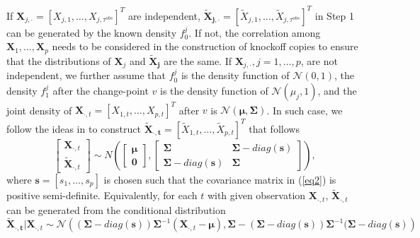 \documentclass[]{interact}
\theoremstyle{plain}%
\theoremstyle{definition}
\theoremstyle{remark}
\begin{document}
If $\bm X_{j,\cdot} = [X_{j,1}, \ldots, X_{j,\tau^{obs}}]^T$ are independent, $\bm{\tilde X_{j,\cdot}} = [\tilde X_{j,1}, \ldots, \tilde X_{j,\tau^{obs}}]^T$ in Step 1 can be generated by the known density $f_0^j$. If not, the correlation among $\bm X_1, \ldots, \bm X_p$ needs to be considered in the construction of knockoff copies to ensure that the distributions of $\bm X_j$ and $\bm{\tilde X_j}$ are the same. If $\bm X_{j,\cdot}, j=1,\ldots,p$, are not independent, we further assume that $f^j_0$ is the density function of $\mathcal{N} (0,1)$, the density $f_1^j$ after the change-point $v$ is the density function of $\mathcal{N} (\mu_j, 1)$, and the joint density of $\bm X_{\cdot, t} = [X_{1,t}, \ldots, X_{p,t}]^T$ after $v$ is $\mathcal{N} (\bm \mu, \bm \Sigma)$. In such case, we follow the ideas in \cite{barber2015controlling} to construct $\bm{\tilde X_{\cdot, t}} = [\tilde X_{1,t}, \ldots, \tilde X_{p,t}]^T$ that follows 
\begin{equation} \label{eq2}
\begin{bmatrix}
\bm X_{\cdot,t} \\
\bm{\tilde X }_{\cdot,t}
\end{bmatrix}
\sim
N \left ( 
\begin{bmatrix}
\bm \mu \\
\bm 0
\end{bmatrix},
\begin{bmatrix} 
\bm \Sigma & \bm \Sigma - diag(\bm s) \\ 
\bm \Sigma - diag(\bm s) & \bm \Sigma 
\end{bmatrix}
\right),
\end{equation}
where $\bm s = [s_1, \ldots, s_p]$ is chosen such that the covariance matrix in (\ref{eq2}) is positive semi-definite. Equivalently, for each $t$ with given observation $\bm X_{\cdot, t}$, $\bm{\tilde X}_{\cdot, t}$ can be generated from the conditional distribution
\begin{equation}\label{eq3}
\bm{\tilde X_{\cdot, t}}|\bm X_{\cdot, t} \sim \mathcal{N}\left((\bm \Sigma - diag(\bm s))\bm \Sigma^{-1} (\bm X_{\cdot,t} - \bm \mu), \bm \Sigma - (\bm \Sigma-diag(\bm s))\bm \Sigma^{-1}(\bm \Sigma-diag(\bm s)\right)
\end{equation}
\end{document}
